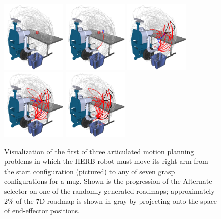 \documentclass[nobib]{tufte-book}
\begin{document}
\begin{figure}
\centering
\includegraphics[width=3.1cm]{figs/lazysp-herbarm/herbarm-roadmap.png}
\includegraphics[width=3.1cm]{figs/lazysp-herbarm/herbarm-path02.png}
\includegraphics[width=3.1cm]{figs/lazysp-herbarm/herbarm-path33.png}
\includegraphics[width=3.1cm]{figs/lazysp-herbarm/herbarm-path42.png}
\includegraphics[width=3.1cm]{figs/lazysp-herbarm/herbarm-path46.png}
\caption{Visualization of the first of three articulated motion
   planning problems in which the HERB robot must move its right arm
   from the start configuration (pictured)
   to any of seven grasp configurations for a mug.
   Shown is the progression of the Alternate selector on one of the
   randomly generated roadmaps;
   approximately 2\% of the 7D roadmap is shown in gray by projecting
   onto the space of end-effector positions.}
\label{fig:herbbin0}
\end{figure}
\end{document}

